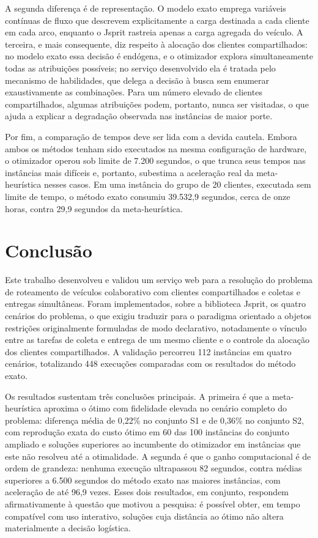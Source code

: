 \documentclass[a4paper,12pt]{article}
\begin{document}
A segunda diferença é de representação. O modelo exato emprega variáveis contínuas de fluxo que descrevem explicitamente a carga destinada a cada cliente em cada arco, enquanto o Jsprit rastreia apenas a carga agregada do veículo. A terceira, e mais consequente, diz respeito à alocação dos clientes compartilhados: no modelo exato essa decisão é endógena, e o otimizador explora simultaneamente todas as atribuições possíveis; no serviço desenvolvido ela é tratada pelo mecanismo de habilidades, que delega a decisão à busca sem enumerar exaustivamente as combinações. Para um número elevado de clientes compartilhados, algumas atribuições podem, portanto, nunca ser visitadas, o que ajuda a explicar a degradação observada nas instâncias de maior porte.

Por fim, a comparação de tempos deve ser lida com a devida cautela. Embora ambos os métodos tenham sido executados na mesma configuração de hardware, o otimizador operou sob limite de 7.200 segundos, o que trunca seus tempos nas instâncias mais difíceis e, portanto, subestima a aceleração real da meta-heurística nesses casos. Em uma instância do grupo de 20 clientes, executada sem limite de tempo, o método exato consumiu 39.532,9 segundos, cerca de onze horas, contra 29,9 segundos da meta-heurística.

\section{Conclusão}
Este trabalho desenvolveu e validou um serviço web para a resolução do problema de roteamento de veículos colaborativo com clientes compartilhados e coletas e entregas simultâneas. Foram implementados, sobre a biblioteca Jsprit, os quatro cenários do problema, o que exigiu traduzir para o paradigma orientado a objetos restrições originalmente formuladas de modo declarativo, notadamente o vínculo entre as tarefas de coleta e entrega de um mesmo cliente e o controle da alocação dos clientes compartilhados. A validação percorreu 112 instâncias em quatro cenários, totalizando 448 execuções comparadas com os resultados do método exato.

Os resultados sustentam três conclusões principais. A primeira é que a meta-heurística aproxima o ótimo com fidelidade elevada no cenário completo do problema: diferença média de 0,22\% no conjunto S1 e de 0,36\% no conjunto S2, com reprodução exata do custo ótimo em 60 das 100 instâncias do conjunto ampliado e soluções superiores ao incumbente do otimizador em instâncias que este não resolveu até a otimalidade. A segunda é que o ganho computacional é de ordem de grandeza: nenhuma execução ultrapassou 82 segundos, contra médias superiores a 6.500 segundos do método exato nas maiores instâncias, com aceleração de até 96,9 vezes. Esses dois resultados, em conjunto, respondem afirmativamente à questão que motivou a pesquisa: é possível obter, em tempo compatível com uso interativo, soluções cuja distância ao ótimo não altera materialmente a decisão logística.
\end{document}
